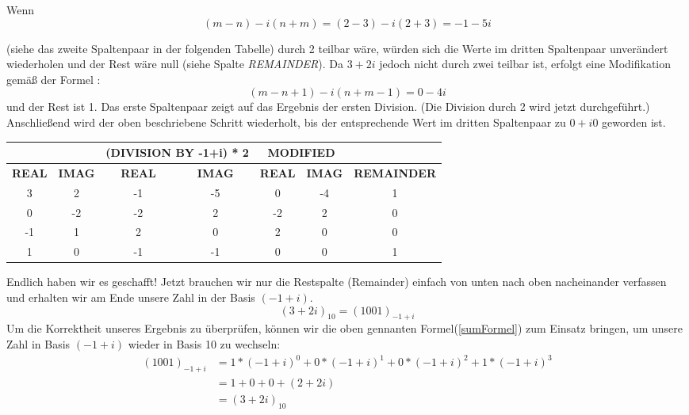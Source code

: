 \documentclass[course=erap]{aspdoc}
\begin{document}
Wenn
\[(m - n) - i(n+m)=(2-3) - i(2 + 3) = -1 - 5i\] 

(siehe das zweite Spaltenpaar in der folgenden Tabelle) durch 2 teilbar wäre, würden sich die Werte im dritten Spaltenpaar unverändert wiederholen und der Rest wäre null (siehe Spalte \textit{REMAINDER}). Da $3 + 2 i$ jedoch nicht durch zwei teilbar ist, erfolgt eine Modifikation gemäß der Formel :
\[(m - n + 1) - i(n + m - 1)= 0 - 4  i\] 
und der Rest ist 1. Das erste Spaltenpaar zeigt auf das Ergebnis der ersten Division. (Die Division durch 2 wird jetzt durchgeführt.) Anschließend wird der oben beschriebene Schritt wiederholt, bis der entsprechende Wert im dritten Spaltenpaar zu $0 + i0$ geworden ist.
\\

\begin{table}[!ht]
\centering
\begin{tabular}{|c|c|cc|cc|c|}
\hline
              &               & \multicolumn{2}{c|}{\textbf{(DIVISION BY -1+i) * 2}} & \multicolumn{2}{c|}{\textbf{MODIFIED}}             &                  \\ \hline
\textbf{REAL} & \textbf{IMAG} & \multicolumn{1}{c|}{\textbf{REAL}}  & \textbf{IMAG}  & \multicolumn{1}{c|}{\textbf{REAL}} & \textbf{IMAG} & \textbf{REMAINDER} \\ \hline
3             & 2             & \multicolumn{1}{c|}{-1}             & -5             & \multicolumn{1}{c|}{0}             & -4            & 1                  \\ \hline
0             & -2            & \multicolumn{1}{c|}{-2}             & 2              & \multicolumn{1}{c|}{-2}            & 2             & 0                  \\ \hline
-1            & 1             & \multicolumn{1}{c|}{2}              & 0              & \multicolumn{1}{c|}{2}             & 0             & 0                  \\ \hline
1             & 0             & \multicolumn{1}{c|}{-1}             & -1             & \multicolumn{1}{c|}{0}             & 0             & 1                  \\ \hline
\end{tabular}
\end{table}

Endlich haben wir es geschafft! Jetzt brauchen wir nur die Restspalte (Remainder) einfach von unten nach oben nacheinander verfassen und erhalten wir am Ende unsere Zahl in der Basis $(-1+i)$.
\[(3 + 2i)_{10} = (1001)_{-1+i}\]
\newline
Um die Korrektheit unseres Ergebnis zu überprüfen, können wir die oben gennanten Formel(\ref{sumFormel}) zum Einsatz bringen, um unsere Zahl in Basis $(-1+i)$ wieder in Basis 10 zu wechseln:
\begin{equation*}
    \begin{split}
        (1001)_{-1+i} &= 1*(-1+i)^0 + 0*(-1+i)^1 + 0*(-1+i)^2 +1*(-1+i)^3 \\
        &=1 + 0 + 0 + (2 + 2i) \\
        &= (3+2i)_{10}
    \end{split}   
\end{equation*}
\end{document}
